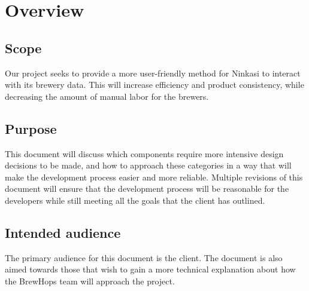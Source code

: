 \documentclass[draftclsnofoot,onecolumn,letterpaper,10pt]{IEEEtran}
\begin{document}
\section{Overview}
	\subsection{Scope}

	Our project seeks to provide a more user-friendly method for Ninkasi to interact with its brewery data.
	This will increase efficiency and product consistency, while decreasing the amount of manual labor for the brewers.

	\subsection{Purpose}

	This document will discuss which components require more intensive design decisions to be made, and how to approach these categories in a way that will make the development process easier and more reliable.
	Multiple revisions of this document will ensure that the development process will be reasonable for the developers while still meeting all the goals that the client has outlined.

	\subsection{Intended audience}

	The primary audience for this document is the client.
	The document is also aimed towards those that wish to gain a more technical explanation about how the BrewHops team will approach the project.
\end{document}
